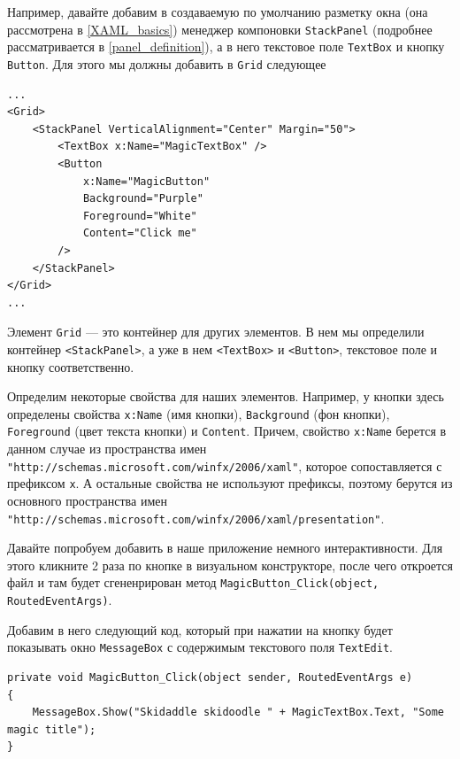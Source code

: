Например, давайте добавим в создаваемую по умолчанию разметку окна (она рассмотрена в \ref{XAML_basics}) менеджер компоновки \texttt{StackPanel} (подробнее рассматривается в \ref{panel_definition}), а в него текстовое поле \texttt{TextBox} и кнопку \texttt{Button}. Для этого мы должны добавить в \texttt{Grid} следующее

\begin{verbatim}
...
<Grid>
    <StackPanel VerticalAlignment="Center" Margin="50">
        <TextBox x:Name="MagicTextBox" />
        <Button 
            x:Name="MagicButton" 
            Background="Purple" 
            Foreground="White" 
            Content="Click me" 
        />
    </StackPanel>
</Grid>
...
\end{verbatim}

Элемент \texttt{Grid} — это контейнер для других элементов. В нем мы определили контейнер \texttt{<StackPanel>}, а уже в нем \texttt{<TextBox>} и \texttt{<Button>}, текстовое поле и кнопку соответственно.

Определим некоторые свойства для наших элементов. Например, у кнопки здесь определены свойства \texttt{x:Name} (имя кнопки), \texttt{Background} (фон кнопки), \texttt{Foreground} (цвет текста кнопки) и \texttt{Content}. Причем, свойство \texttt{x:Name} берется в данном случае из пространства имен \texttt{"http://schemas.microsoft.com/winfx/2006/xaml"}, которое сопоставляется с префиксом \texttt{x}. 
А остальные свойства не используют префиксы, поэтому берутся из основного пространства имен \texttt{"http://schemas.microsoft.com/winfx/2006/xaml/presentation"}.

Давайте попробуем добавить в наше приложение немного интерактивности. Для этого кликните 2 раза по кнопке в визуальном конструкторе, после чего откроется файл  и там будет сгененрирован метод \texttt{MagicButton_Click(object, RoutedEventArgs)}.

Добавим в него следующий код, который при нажатии на кнопку будет показывать окно \texttt{MessageBox} с содержимым текстового поля \texttt{TextEdit}.

\begin{verbatim}
private void MagicButton_Click(object sender, RoutedEventArgs e)
{
    MessageBox.Show("Skidaddle skidoodle " + MagicTextBox.Text, "Some magic title");
}
\end{verbatim}


